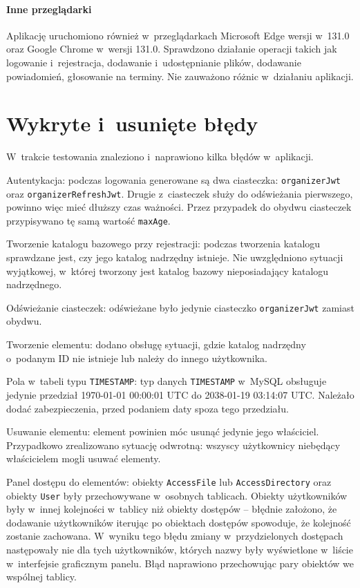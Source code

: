 \documentclass[a4paper,twoside,12pt]{book}
\begin{document}
\paragraph{Inne przeglądarki}
Aplikację uruchomiono również w~przeglądarkach Microsoft Edge wersji w~131.0 oraz Google Chrome w~wersji 131.0. Sprawdzono działanie operacji takich jak logowanie i~rejestracja, dodawanie i~udostępnianie plików, dodawanie powiadomień, głosowanie na terminy. Nie zauważono różnic w~działaniu aplikacji.

\section{Wykryte i~usunięte błędy}
W~trakcie testowania znaleziono i~naprawiono kilka błędów w~aplikacji. 

Autentykacja: podczas logowania generowane są dwa ciasteczka: \texttt{organizerJwt} oraz \texttt{organizerRefreshJwt}. Drugie z~ciasteczek służy do odświeżania pierwszego, powinno więc mieć dłuższy czas ważności. Przez przypadek do obydwu ciasteczek przypisywano tę samą wartość \texttt{maxAge}.

Tworzenie katalogu bazowego przy rejestracji: podczas tworzenia katalogu sprawdzane jest, czy jego katalog nadrzędny istnieje. Nie uwzględniono sytuacji wyjątkowej, w~której tworzony jest katalog bazowy nieposiadający katalogu nadrzędnego.

Odświeżanie ciasteczek: odświeżane było jedynie ciasteczko \texttt{organizerJwt} zamiast obydwu. 

Tworzenie elementu: dodano obsługę sytuacji, gdzie katalog nadrzędny o~podanym ID nie istnieje lub należy do innego użytkownika.

Pola w~tabeli typu \texttt{TIMESTAMP}: typ danych \texttt{TIMESTAMP} w~MySQL obsługuje jedynie przedział 1970-01-01 00:00:01 UTC do 2038-01-19 03:14:07 UTC. Należało dodać zabezpieczenia, przed podaniem daty spoza tego przedziału.

Usuwanie elementu: element powinien móc usunąć jedynie jego właściciel. Przypadkowo zrealizowano sytuację odwrotną: wszyscy użytkownicy niebędący właścicielem mogli usuwać elementy.

Panel dostępu do elementów: obiekty \texttt{AccessFile} lub \texttt{AccessDirectory} oraz obiekty \texttt{User} były przechowywane w~osobnych tablicach. Obiekty użytkowników były w~innej kolejności w~tablicy niż obiekty dostępów -- błędnie założono, że dodawanie użytkowników iterując po obiektach dostępów spowoduje, że kolejność zostanie zachowana. W~wyniku tego błędu zmiany w~przydzielonych dostępach następowały nie dla tych użytkowników, których nazwy były wyświetlone w~liście w~interfejsie graficznym panelu. Błąd naprawiono przechowując pary obiektów we wspólnej tablicy.
\end{document}
